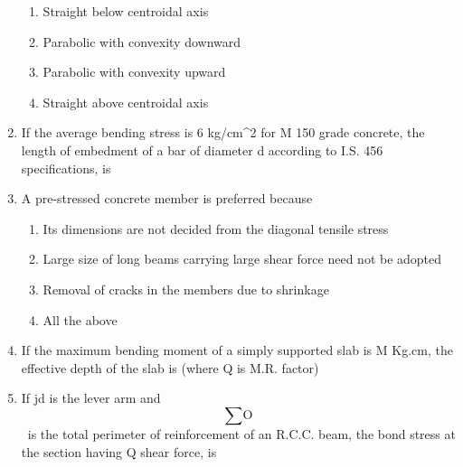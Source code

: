 \documentclass[11pt,a4paper]{article}
\begin{document}
\begin{enumerate}
\begin{enumerate}[label=\Alph*.]
\item{Straight below centroidal axis}
\item{Parabolic with convexity downward}
\item{Parabolic with convexity upward}
\item{Straight above centroidal axis}
\end{enumerate}
\item{If the average bending stress is 6 kg/cm\^{}2 for M 150 grade concrete, the length of embedment of a bar of diameter d according to I.S. 456 specifications, is
}
\\
\item{A pre-stressed concrete member is preferred because}
\begin{enumerate}[label=\Alph*.]
\item{Its dimensions are not decided from the diagonal tensile stress}
\item{Large size of long beams carrying large shear force need not be adopted}
\item{Removal of cracks in the members due to shrinkage}
\item{All the above}
\end{enumerate}
\item{If the maximum bending moment of a simply supported slab is M Kg.cm, the effective depth of the slab is (where Q is M.R. factor)}
\\
\item{If jd is the lever arm and $$\sum {\text{O}} $$ ~is the total perimeter of reinforcement of an R.C.C. beam, the bond stress at the section having Q shear force, is
}
\end{enumerate}
\end{document}
